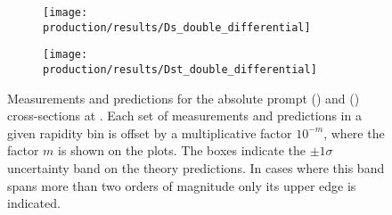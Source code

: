 \begin{figure}
  \begin{subfigure}[b]{\textwidth}
    \centering
    \texttt{[image: production/results/Ds\_double\_differential]}
    \caption{\PDsplus}
    \label{fig:prod:results:double_differential:Ds}
  \end{subfigure}
  \begin{subfigure}[b]{\textwidth}
    \centering
    \texttt{[image: production/results/Dst\_double\_differential]}
    \caption{\PDstarp}
    \label{fig:prod:results:double_differential:Dst}
  \end{subfigure}
  \caption{%
    Measurements and predictions for the absolute prompt \PDsplus
    () and \PDstarp
    () cross-sections at
    .
    Each set of measurements and predictions in a given rapidity bin is offset
    by a multiplicative factor $10^{-m}$, where the factor $m$ is shown on the
    plots.
    The boxes indicate the $\pm1\sigma$ uncertainty band on the theory
    predictions.
    In cases where this band spans more than two orders of magnitude only its
    upper edge is indicated.
  }
  \label{fig:prod:results:double_differential:Ds_Dst}
\end{figure}

